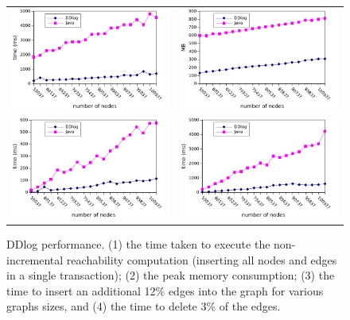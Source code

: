 \begin{figure}
  \begin{center}
    \begin{tabular}{ll}
      \includegraphics[width=.5\columnwidth]{non-incremental.pdf} &
      \includegraphics[width=.5\columnwidth]{memory.pdf} \\
      \includegraphics[width=.5\columnwidth]{insertion.pdf} &
      \includegraphics[width=.5\columnwidth]{deletion.pdf} \\
    \end{tabular}
  \end{center}
    \caption{DDlog performance.  (1) the time taken to execute the
      non-incremental reachability computation (inserting all nodes
      and edges in a single transaction); (2) the peak memory
      consumption; (3) the time to insert an additional 12\% edges
      into the graph for various graphs sizes, and (4) the time to
      delete 3\% of the edges.\label{fig:performance}}
\end{figure}
